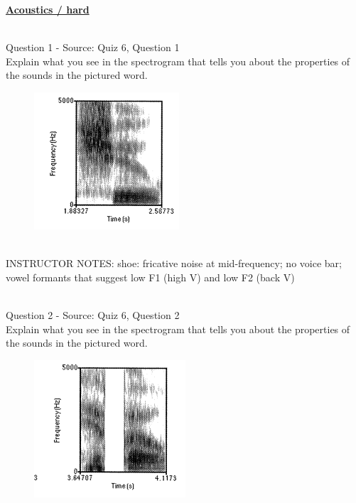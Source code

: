 \documentclass[12pt]{article}
\begin{document}
\begin{center}
\textbf{{\color{violet}{\HUGE ALL QUESTIONS\\}}}

\textbf{{\color{violet}{\HUGE BY TOPIC\\}}}

\end{center}
\newpage

\textbf{\underline{\huge Acoustics / hard\\}}

~\\

{\large Question 1} - Source: Quiz 6, Question 1\\

Explain what you see in the spectrogram that tells you about the properties of the sounds in the pictured word.\\

\begin{figure}[H]
\includegraphics{../images/spectrogram_shoe.png}
\end{figure}

~\\
INSTRUCTOR NOTES: shoe: fricative noise at mid-frequency; no voice bar; vowel formants that suggest low F1 (high V) and low F2 (back V)


~\\

{\large Question 2} - Source: Quiz 6, Question 2\\

Explain what you see in the spectrogram that tells you about the properties of the sounds in the pictured word.\\

\begin{figure}[H]
\includegraphics{../images/spectrogram_hippo.png}
\end{figure}
\end{document}
